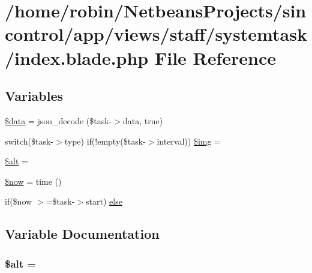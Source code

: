 \hypertarget{staff_2systemtask_2index_8blade_8php}{}\section{/home/robin/\+Netbeans\+Projects/sincontrol/app/views/staff/systemtask/index.blade.\+php File Reference}
\label{staff_2systemtask_2index_8blade_8php}
\subsection*{Variables}
\begin{DoxyCompactItemize}
\item 
\hyperlink{staff_2systemtask_2index_8blade_8php_a6efc15b5a2314dd4b5aaa556a375c6d6}{\$data} = json\+\_\+decode (\$task-\/$>$data, true)
\item 
switch(\$task-\/$>$type) if(!empty(\$task-\/$>$interval)) \hyperlink{staff_2systemtask_2index_8blade_8php_a423dd871164e8731d1420cb5456fab6f}{\$img} = \textquotesingle{}\textquotesingle{}
\item 
\hyperlink{staff_2systemtask_2index_8blade_8php_a6d5e116b218efb8fa2aa69b75ad2b0b5}{\$alt} = \textquotesingle{}\textquotesingle{}
\item 
\hyperlink{staff_2systemtask_2index_8blade_8php_af1d5ccdee975b8f4d20aaffc5b28557c}{\$now} = time ()
\item 
if(\$now $>$=\$task-\/$>$start) \hyperlink{staff_2systemtask_2index_8blade_8php_aff58cfff2c93dbf4380c4f920afa1596}{else}
\end{DoxyCompactItemize}


\subsection{Variable Documentation}
\hypertarget{staff_2systemtask_2index_8blade_8php_a6d5e116b218efb8fa2aa69b75ad2b0b5}{}
\subsubsection[{\$alt}]{\setlength{\rightskip}{0pt plus 5cm}\$alt = \textquotesingle{}\textquotesingle{}}\label{staff_2systemtask_2index_8blade_8php_a6d5e116b218efb8fa2aa69b75ad2b0b5}
\hypertarget{staff_2systemtask_2index_8blade_8php_a6efc15b5a2314dd4b5aaa556a375c6d6}{}
